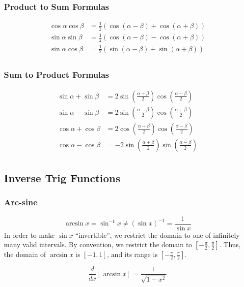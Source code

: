 \documentclass{article}
\begin{document}
\subsubsection{Product to Sum Formulas}
\begin{align*}
    \cos{\alpha}\cos{\beta}&=\frac{1}{2}\left(\cos\left(\alpha-\beta\right)+\cos{\left(\alpha+\beta\right)}\right)\\
    \sin{\alpha}\sin{\beta}&=\frac{1}{2}\left(\cos\left(\alpha-\beta\right)-\cos{\left(\alpha+\beta\right)}\right)\\
    \sin{\alpha}\cos{\beta}&=\frac{1}{2}\left(\sin\left(\alpha-\beta\right)+\sin{\left(\alpha+\beta\right)}\right)\\
\end{align*}

\subsubsection{Sum to Product Formulas}
\begin{align*}
    \sin{\alpha}+\sin{\beta}&=2\sin{\left(\frac{\alpha+\beta}{2}\right)}\cos{\left(\frac{\alpha-\beta}{2}\right)}\\
    \sin{\alpha}-\sin{\beta}&=2\sin{\left(\frac{\alpha-\beta}{2}\right)}\cos{\left(\frac{\alpha+\beta}{2}\right)}\\
    \cos{\alpha}+\cos{\beta}&=2\cos{\left(\frac{\alpha+\beta}{2}\right)}\cos{\left(\frac{\alpha-\beta}{2}\right)}\\
    \cos{\alpha}-\cos{\beta}&=-2\sin{\left(\frac{\alpha+\beta}{2}\right)}\sin{\left(\frac{\alpha-\beta}{2}\right)}\\
\end{align*}

\subsection{Inverse Trig Functions}
\subsubsection{Arc-sine}
$$\arcsin{x}=\sin^{-1}x\ne\left(\sin{x}\right)^{-1}=\frac{1}{\sin{x}}$$
In order to make $\sin{x}$ ``invertible'', we restrict the domain to one of infinitely many valid intervals. By convention, we restrict the domain to $\left[-\frac{\pi}{2},\frac{\pi}{2}\right]$. Thus, the domain of $\arcsin{x}$ is $[-1,1]$, and its range is $\left[-\frac{\pi}{2},\frac{\pi}{2}\right]$.

$$\frac{d}{dx}\left[\arcsin{x}\right]=\frac{1}{\sqrt{1-x^2}}$$
\end{document}
